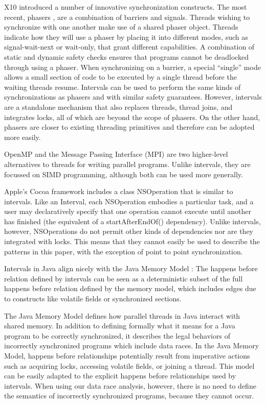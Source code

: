 X10 \cite{Charles2005, Saraswat2010} introduced a number of innovative
synchronization constructs. The most recent, phasers
\cite{Shirako2008, Shirako2010}, are a combination of barriers and
signals. Threads wishing to synchronize with one another make use of a
shared phaser object.  Threads indicate how they will use a phaser by
placing it into different modes, such as signal-wait-next or
wait-only, that grant different capabilities. A combination of static
and dynamic safety checks ensures that programs cannot be deadlocked
through using a phaser. When synchronizing on a barrier, a special
“single” mode allows a small section of code to be executed by a
single thread before the waiting threads resume. Intervals can be used
to perform the same kinds of synchronizations as phasers and with
similar safety guarantees. However, intervals are a standalone
mechanism that also replaces threads, thread joins, and integrates
locks, all of which are beyond the scope of phasers. On the other
hand, phasers are closer to existing threading primitives and
therefore can be adopted more easily.

OpenMP \cite{OpenMP2008} and the Message Passing Interface (MPI)
\cite{MPI2009} are two higher-level alternatives to threads for
writing parallel programs. Unlike intervals, they are focussed on SIMD
programming, although both can be used more generally.

Apple's Cocoa framework includes a class NSOperation \cite{Apple2008}
that is similar to intervals. Like an Interval, each NSOperation
embodies a particular task, and a user may declaratively specify that
one operation cannot execute until another has finished (the
equivalent of a startAfterEndOf() dependency). Unlike intervals,
however, NSOperations do not permit other kinds of dependencies nor
are they integrated with locks. This means that they cannot easily be
used to describe the patterns in this paper, with the exception of
point to point synchronization.

Intervals in Java align nicely with the Java Memory Model
\cite{Manson2005}: The happens before relation defined by intervals
can be seen as a deterministic subset of the full happens before
relation defined by the memory model, which includes edges due to
constructs like volatile fields or synchronized sections.

The Java Memory Model \cite{Manson2005} defines how parallel threads
in Java interact with shared memory. In addition to defining formally
what it means for a Java program to be correctly synchronized, it
describes the legal behaviors of incorrectly synchronized programs
which include data races. In the Java Memory Model, happens before
relationships potentially result from imperative actions such as
acquiring locks, accessing volatile fields, or joining a thread. This
model can be easily adapted to the explicit happens before
relationships used by intervals. When using our data race analysis,
however, there is no need to define the semantics of incorrectly
synchronized programs, because they cannot occur.

